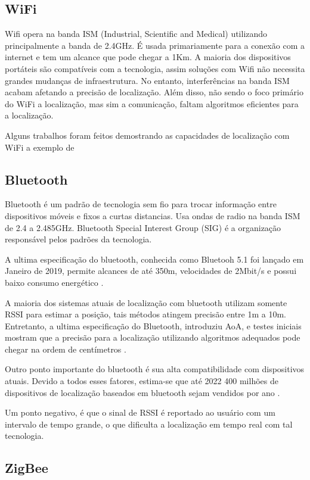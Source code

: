 \subsection{WiFi}
Wifi opera na banda ISM (Industrial, Scientific and Medical) utilizando principalmente a banda de 2.4GHz. É usada primariamente para a conexão com a internet e tem um alcance que pode chegar a 1Km. A maioria dos dispositivos portáteis são compatíveis com a tecnologia, assim soluções com Wifi não necessita grandes mudanças de infraestrutura. No entanto, interferências na banda ISM acabam afetando a precisão de localização. Além disso, não sendo o foco primário do WiFi a localização, mas sim a comunicação, faltam algoritmos eficientes para a localização.

Alguns trabalhos foram feitos demostrando as capacidades de localização com WiFi a exemplo de \cite{art7}

\subsection{Bluetooth}
Bluetooth é um padrão de tecnologia sem fio para trocar informação entre dispositivos móveis e fixos a curtas distancias. Usa ondas de radio na banda ISM de 2.4 a 2.485GHz. Bluetooth Special Interest Group (SIG) é a organização responsável pelos padrões da tecnologia.

A ultima especificação do bluetooth, conhecida como Bluetooh 5.1 foi lançado em Janeiro de 2019, permite alcances de até 350m, velocidades de 2Mbit/s e possui baixo consumo energético \cite{art8}.

A maioria dos sistemas atuais de localização com bluetooth utilizam somente RSSI para estimar a posição, tais métodos atingem precisão entre 1m a 10m. Entretanto, a ultima especificação do Bluetooth, introduziu AoA, e testes iniciais mostram que a precisão para a localização utilizando algoritmos adequados pode chegar na ordem de centímetros \cite{art9}.

Outro ponto importante  do bluetooth é sua alta compatibilidade com dispositivos atuais. Devido a todos esses fatores, estima-se que até 2022 400 milhões de dispositivos de localização baseados em bluetooth sejam vendidos por ano \cite{art9}.

Um ponto negativo, é que o sinal de RSSI é reportado ao usuário com um intervalo de tempo grande, o que dificulta a localização em tempo real com tal tecnologia.

\subsection{ZigBee}

